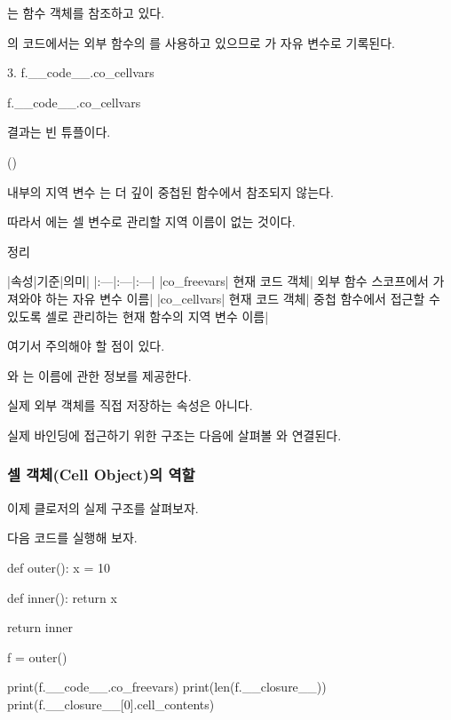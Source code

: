 는  함수 객체를 참조하고 있다.

의 코드에서는 외부 함수의 를 사용하고 있으므로 가 자유 변수로 기록된다.

\begin{dhknote}
\begin{dhksmry}[centered]
3. f.__code__.co_cellvars
\end{dhksmry}
\end{dhknote}

\begin{dhkcode}
f.__code__.co_cellvars
\end{dhkcode}

결과는 빈 튜플이다.

\begin{dhkzsh}
()
\end{dhkzsh}

 내부의 지역 변수 는 더 깊이 중첩된 함수에서 참조되지 않는다.

따라서 에는 셀 변수로 관리할 지역 이름이 없는 것이다.

\begin{dhknote}
\begin{dhksmry}[centered]
정리
\end{dhksmry}
\end{dhknote}

\begin{dhktable}
|속성|기준|의미|
|:---|:---|:---|
|co_freevars|	현재 코드 객체|	외부 함수 스코프에서 가져와야 하는 자유 변수 이름|
|co_cellvars|	현재 코드 객체|	중첩 함수에서 접근할 수 있도록 셀로 관리하는 현재 함수의 지역 변수 이름|
\end{dhktable}

여기서 주의해야 할 점이 있다.

와 는 이름에 관한 정보를 제공한다.

실제 외부 객체를 직접 저장하는 속성은 아니다.

실제 바인딩에 접근하기 위한 구조는 다음에 살펴볼 와 연결된다.

\subsubsection{셀 객체(Cell Object)의 역할}

이제 클로저의 실제 구조를 살펴보자.

다음 코드를 실행해 보자.

\begin{dhkcode}
def outer():
    x = 10

    def inner():
        return x

    return inner


f = outer()

print(f.__code__.co_freevars)
print(len(f.__closure__))
print(f.__closure__[0].cell_contents)
\end{dhkcode}


